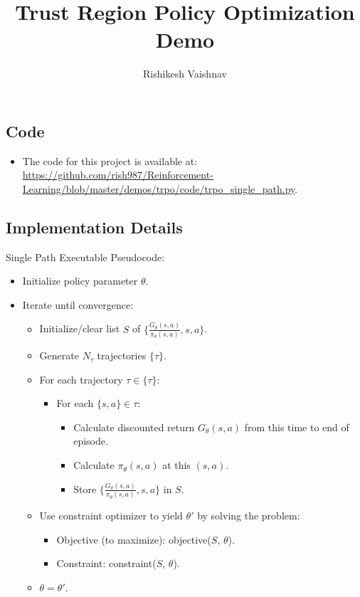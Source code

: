 \documentclass[a4paper]{article}
\title{Trust Region Policy Optimization Demo}
\author{Rishikesh Vaishnav}
\begin{document}
\maketitle
\subsection*{Code}
\begin{itemize}
    \item The code for this project is available at: 
    \url{https://github.com/rish987/Reinforcement-Learning/blob/master/demos/trpo/code/trpo_single_path.py}.
\end{itemize}
\subsection*{Implementation Details}
Single Path Executable Pseudocode:
\begin{itemize}
    \item Initialize policy parameter $\theta$.
    \item Iterate until convergence:
    \begin{itemize}
        \item Initialize/clear list $S$ of $\{\frac{G_{\theta}(s, a)}
            {\pi_{\theta}(s, a)}, s, a\}$.
        \item Generate $N_{\tau}$ trajectories $\{\tau\}$.
        \item For each trajectory $\tau \in \{\tau\}$:
        \begin{itemize}
            \item For each $\{s, a\} \in \tau$:
            \begin{itemize}
                \item Calculate discounted return $G_{\theta}(s, a)$ from this
                    time to end of episode.
                \item Calculate $\pi_{\theta}(s, a)$ at this $(s, a)$.
                \item Store $\{\frac{G_{\theta}(s, a)} 
                    {\pi_{\theta}(s, a)}, s, a\}$ in $S$.
            \end{itemize}
        \end{itemize}
        \item Use constraint optimizer to yield
            $\theta'$ by solving the problem:
        \begin{itemize}
            \item Objective (to maximize): objective($S$, $\theta$).
            \item Constraint: constraint($S$, $\theta$).
        \end{itemize}
        \item $\theta = \theta'$.
    \end{itemize}
\end{itemize}
\end{document}
